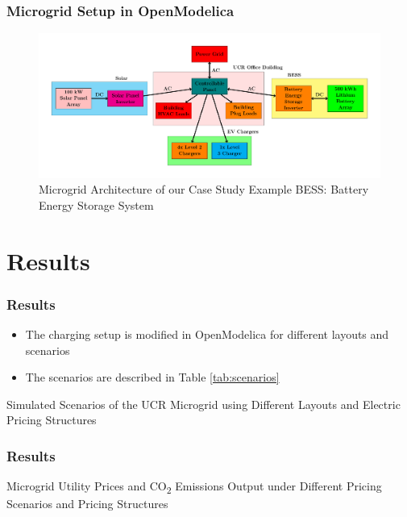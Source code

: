 \documentclass[aspectratio=169, 8 pt]{beamer}
\begin{document}
	\begin{frame}
		\frametitle{Microgrid Setup in OpenModelica}
		\begin{figure}
			\centering
			\includegraphics[width=0.9\linewidth]{Fig/power_system_setup_modelica_large}
			\caption{Microgrid Architecture of our Case Study Example BESS: Battery Energy Storage System}
			\label{fig:powersystemsetupfull}
		\end{figure}
	\end{frame}

\section{Results}	
		
		\begin{frame}
			\frametitle{Results}
			\begin{itemize}
				\item The charging setup is modified in OpenModelica for different layouts and scenarios
				\item The scenarios are described in Table \ref{tab:scenarios}
			\end{itemize}
			
			\begin{table}
				\caption{Simulated Scenarios of the UCR Microgrid using Different Layouts and Electric Pricing Structures}
				\large
				
				\label{tab:scenarios}
			\end{table}
		\end{frame}
		
			\begin{frame}
				\frametitle{Results}
				\begin{table}
					\caption{Microgrid Utility Prices and CO\textsubscript{2} Emissions Output under Different Pricing Scenarios and Pricing Structures}
					\centering
					\large
					
					\label{tab:emissions}
				\end{table}
		\end{frame}
\end{document}
